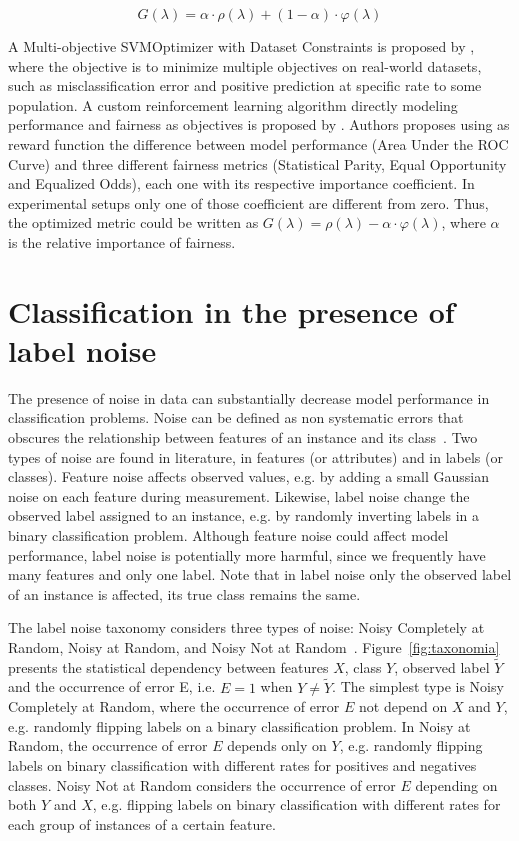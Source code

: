 \begin{equation} \label{eq:moo_smoothed_2}
    G(\lambda) = \alpha \cdot \rho(\lambda) + (1-\alpha) \cdot \varphi(\lambda)
\end{equation}

A Multi-objective SVMOptimizer with Dataset Constraints is proposed by \cite{Goh2016}, where the objective is to minimize multiple objectives on real-world datasets, such as misclassification error and positive prediction at specific rate to some population. A custom reinforcement learning algorithm directly modeling performance and fairness as objectives is proposed by \cite{Petrovic2021}. Authors proposes using as reward function the difference between model performance (Area Under the ROC Curve) and three different fairness metrics (Statistical Parity, Equal Opportunity and Equalized Odds), each one with its respective importance coefficient. In experimental setups only one of those coefficient are different from zero. Thus, the optimized metric could be written as $G(\lambda) = \rho(\lambda) - \alpha \cdot \varphi(\lambda)$, where $\alpha$ is the relative importance of fairness.


\section{Classification in the presence of label noise}

The presence of noise in data can substantially decrease model performance in classification problems. Noise can be defined as non systematic errors that obscures the relationship between features of an instance and its class~\citep{Frenay2014,Hickey1996,Quinlan1986}. Two types of noise are found in literature, in features (or attributes) and in labels (or classes). Feature noise affects observed values, e.g. by adding a small Gaussian noise on each feature during measurement. Likewise, label noise change the observed label assigned to an instance, e.g. by randomly inverting labels in a binary classification problem. Although feature noise could affect model performance, label noise is potentially more harmful, since we frequently have many features and only one label. Note that in label noise only the observed label of an instance is affected, its true class remains the same.

The label noise taxonomy considers three types of noise: Noisy Completely at Random, Noisy at Random, and Noisy Not at Random~\citep{Frenay2014}. Figure~\ref{fig:taxonomia} presents the statistical dependency between features $X$, class $Y$, observed label $\tilde{Y}$ and the occurrence of error E, i.e. $E=1$ when $Y \neq \tilde{Y}$. The simplest type is Noisy Completely at Random, where the occurrence of error $E$ not depend on $X$ and $Y$, e.g. randomly flipping labels on a binary classification problem. In Noisy at Random, the occurrence of error $E$ depends only on $Y$, e.g. randomly flipping labels on binary classification with different rates for positives and negatives classes. Noisy Not at Random considers the occurrence of error $E$ depending on both $Y$ and $X$, e.g. flipping labels on binary classification with different rates for each group of instances of a certain feature.


